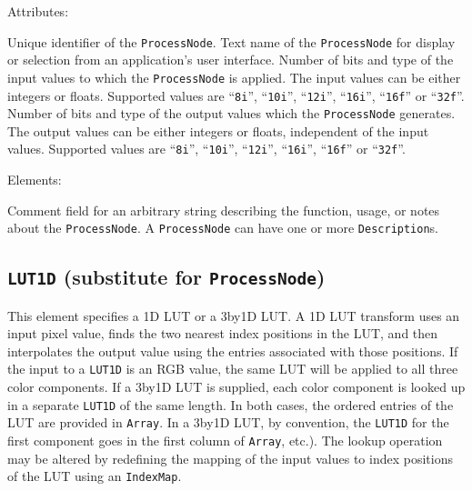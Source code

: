 Attributes:
\begin{xmlfields}
	\xmlitem[id][optional]  Unique identifier of the \texttt{ProcessNode}.
	\xmlitem[name][optional] Text name of the \texttt{ProcessNode} for display or selection from an application's user interface.
	\xmlitem[inBitDepth][required] Number of bits and type of the input values to which the \texttt{ProcessNode} is applied. The input values can be either integers or floats. Supported values are ``\texttt{8i}'', ``\texttt{10i}'', ``\texttt{12i}'', ``\texttt{16i}'', ``\texttt{16f}'' or ``\texttt{32f}''.
	\xmlitem[outBitDepth][required] Number of bits and type of the output values which the \texttt{ProcessNode} generates. The output values can be either integers or floats, independent of the input values. Supported values are ``\texttt{8i}'', ``\texttt{10i}'', ``\texttt{12i}'', ``\texttt{16i}'', ``\texttt{16f}'' or ``\texttt{32f}''.
\end{xmlfields}

Elements:
\begin{xmlfields}
	\xmlitem[Description][optional] Comment field for an arbitrary string describing the function, usage, or notes about the \texttt{ProcessNode}. A \texttt{ProcessNode} can have one or more \texttt{Description}s.
\end{xmlfields}

\subsection{\texttt{LUT1D} (substitute for \texttt{ProcessNode})}
This element specifies a 1D LUT or a 3by1D LUT.  A 1D LUT transform uses an input pixel value, finds the two nearest index positions in the LUT, and then interpolates the output value using the entries associated with those positions. If the input to a \texttt{LUT1D} is an RGB value, the same LUT will be applied to all three color components. If a 3by1D LUT is supplied, each color component is looked up in a separate \texttt{LUT1D} of the same length. In both cases, the ordered entries of the LUT are provided in \texttt{Array}.  In a 3by1D LUT, by convention, the \texttt{LUT1D} for the first component goes in the first column of \texttt{Array},  etc.).  The lookup operation may be altered by redefining the mapping of the input values to index positions of the LUT using an \texttt{IndexMap}.

